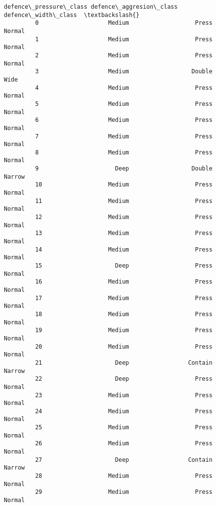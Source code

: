\documentclass[11pt]{article}
\begin{document}
\begin{Verbatim}[commandchars=\\\{\}]
              defence\_pressure\_class defence\_aggresion\_class defence\_width\_class  \textbackslash{}
         0                    Medium                   Press              Normal   
         1                    Medium                   Press              Normal   
         2                    Medium                   Press              Normal   
         3                    Medium                  Double                Wide   
         4                    Medium                   Press              Normal   
         5                    Medium                   Press              Normal   
         6                    Medium                   Press              Normal   
         7                    Medium                   Press              Normal   
         8                    Medium                   Press              Normal   
         9                      Deep                  Double              Narrow   
         10                   Medium                   Press              Normal   
         11                   Medium                   Press              Normal   
         12                   Medium                   Press              Normal   
         13                   Medium                   Press              Normal   
         14                   Medium                   Press              Normal   
         15                     Deep                   Press              Normal   
         16                   Medium                   Press              Normal   
         17                   Medium                   Press              Normal   
         18                   Medium                   Press              Normal   
         19                   Medium                   Press              Normal   
         20                   Medium                   Press              Normal   
         21                     Deep                 Contain              Narrow   
         22                     Deep                   Press              Normal   
         23                   Medium                   Press              Normal   
         24                   Medium                   Press              Normal   
         25                   Medium                   Press              Normal   
         26                   Medium                   Press              Normal   
         27                     Deep                 Contain              Narrow   
         28                   Medium                   Press              Normal   
         29                   Medium                   Press              Normal   

\end{Verbatim}
\end{document}
